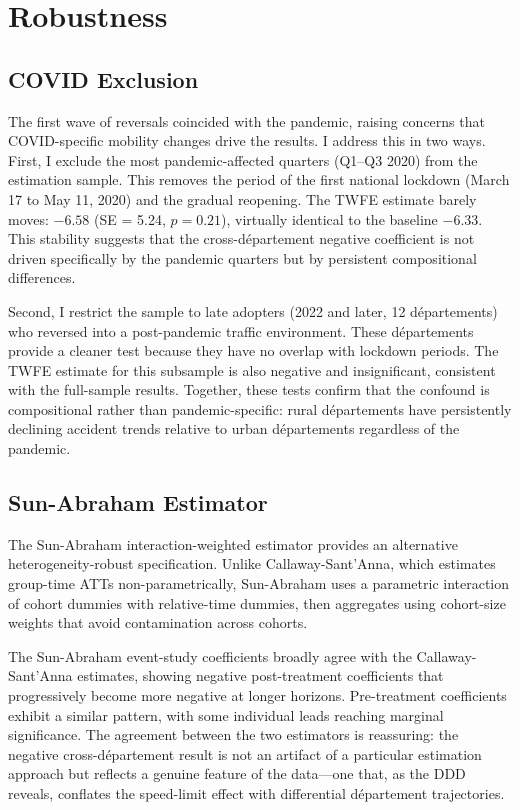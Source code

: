 \documentclass[12pt]{article}
\begin{document}
\section{Robustness} \label{sec:robustness}

\subsection{COVID Exclusion}

The first wave of reversals coincided with the pandemic, raising concerns that COVID-specific mobility changes drive the results. I address this in two ways. First, I exclude the most pandemic-affected quarters (Q1--Q3 2020) from the estimation sample. This removes the period of the first national lockdown (March 17 to May 11, 2020) and the gradual reopening. The TWFE estimate barely moves: $-6.58$ (SE = 5.24, $p = 0.21$), virtually identical to the baseline $-6.33$. This stability suggests that the cross-d\'{e}partement negative coefficient is not driven specifically by the pandemic quarters but by persistent compositional differences.

Second, I restrict the sample to late adopters (2022 and later, 12 d\'{e}partements) who reversed into a post-pandemic traffic environment. These d\'{e}partements provide a cleaner test because they have no overlap with lockdown periods. The TWFE estimate for this subsample is also negative and insignificant, consistent with the full-sample results. Together, these tests confirm that the confound is compositional rather than pandemic-specific: rural d\'{e}partements have persistently declining accident trends relative to urban d\'{e}partements regardless of the pandemic.

\subsection{Sun-Abraham Estimator}

The Sun-Abraham \citep{sun2021} interaction-weighted estimator provides an alternative heterogeneity-robust specification. Unlike Callaway-Sant'Anna, which estimates group-time ATTs non-parametrically, Sun-Abraham uses a parametric interaction of cohort dummies with relative-time dummies, then aggregates using cohort-size weights that avoid contamination across cohorts.

The Sun-Abraham event-study coefficients broadly agree with the Callaway-Sant'Anna estimates, showing negative post-treatment coefficients that progressively become more negative at longer horizons. Pre-treatment coefficients exhibit a similar pattern, with some individual leads reaching marginal significance. The agreement between the two estimators is reassuring: the negative cross-d\'{e}partement result is not an artifact of a particular estimation approach but reflects a genuine feature of the data---one that, as the DDD reveals, conflates the speed-limit effect with differential d\'{e}partement trajectories.
\end{document}
